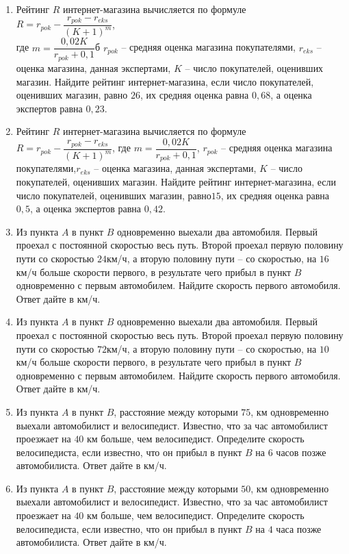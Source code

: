 \documentclass[12pt, a4paper]{article}
\begin{document}
\begin{enumerate}
		\item Рейтинг \( R \) интернет-магазина вычисляется по формуле \\
		\( R=r_{pok}-\dfrac{r_{pok}-r_{eks}}{(K+1)^m} \),\\
		где \( m=\dfrac{0,02K}{r_{pok}+0,1} \)б \( r_{pok} \) – средняя оценка магазина покупателями, \( r_{eks} \) – оценка магазина, данная экспертами, \( K \) – число покупателей, оценивших магазин. Найдите рейтинг интернет-магазина, если число покупателей, оценивших магазин, равно \( 26 \), их средняя оценка равна \(0,68\), а оценка экспертов равна \(0,23\).
		\item Рейтинг \( R \) интернет-магазина вычисляется по формуле \( R=r_{pok}-\dfrac{r_{pok}-r_{eks}}{(K+1)^m} \), где \( m=\dfrac{0,02K}{r_{pok}+0,1} \), \( r_{pok} \) – средняя оценка магазина покупателями,\( r_{eks} \) – оценка магазина, данная экспертами, \( K \) – число покупателей, оценивших магазин. Найдите рейтинг интернет-магазина, если число покупателей, оценивших магазин, равно\(  15 \), их средняя оценка равна \(  0,5 \), а оценка экспертов равна \( 0,42 \).
		\item Из пункта \( A \) в пункт \( B \) одновременно выехали два автомобиля. Первый проехал с постоянной скоростью весь путь. Второй проехал первую половину пути со скоростью \( 24 \)км/ч, а вторую половину пути – со скоростью, на \(16\) км/ч больше скорости первого, в результате чего прибыл в пункт \( B \) одновременно с первым автомобилем. Найдите скорость первого автомобиля. Ответ дайте в км/ч.
		\item Из пункта \( A \) в пункт \( B \) одновременно выехали два автомобиля. Первый проехал с постоянной скоростью весь путь. Второй проехал первую половину пути со скоростью \( 72 \)км/ч, а вторую половину пути – со скоростью, на \(10\) км/ч больше скорости первого, в результате чего прибыл в пункт \( B \) одновременно с первым автомобилем. Найдите скорость первого автомобиля. Ответ дайте в км/ч.
		\item Из пункта \( A \) в пункт \( B \), расстояние между которыми \(75\), км одновременно выехали автомобилист и велосипедист. Известно, что за час автомобилист проезжает на \(40\) км больше, чем велосипедист. Определите скорость велосипедиста, если известно, что он прибыл в пункт \(B\) на \(6\) часов позже автомобилиста. Ответ дайте в км/ч.
		\item Из пункта \( A \) в пункт \( B \), расстояние между которыми \(50\), км одновременно выехали автомобилист и велосипедист. Известно, что за час автомобилист проезжает на \(40\) км больше, чем велосипедист. Определите скорость велосипедиста, если известно, что он прибыл в пункт \(B\) на \(4\) часа позже автомобилиста. Ответ дайте в км/ч.

\end{enumerate}
\end{document}
